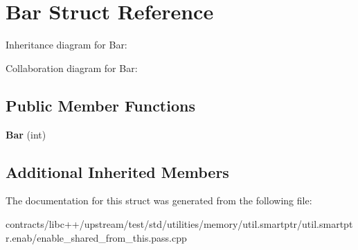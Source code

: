 \hypertarget{struct_bar}{}\section{Bar Struct Reference}
\label{struct_bar}


Inheritance diagram for Bar\+:


Collaboration diagram for Bar\+:
\subsection*{Public Member Functions}
\begin{DoxyCompactItemize}
\item 
\mbox{\label{struct_bar_a12779c2f5e8f80babc54de191f5d71cf}} 
{\bfseries Bar} (int)
\end{DoxyCompactItemize}
\subsection*{Additional Inherited Members}


The documentation for this struct was generated from the following file\+:\begin{DoxyCompactItemize}
\item 
contracts/libc++/upstream/test/std/utilities/memory/util.\+smartptr/util.\+smartptr.\+enab/enable\+\_\+shared\+\_\+from\+\_\+this.\+pass.\+cpp\end{DoxyCompactItemize}

